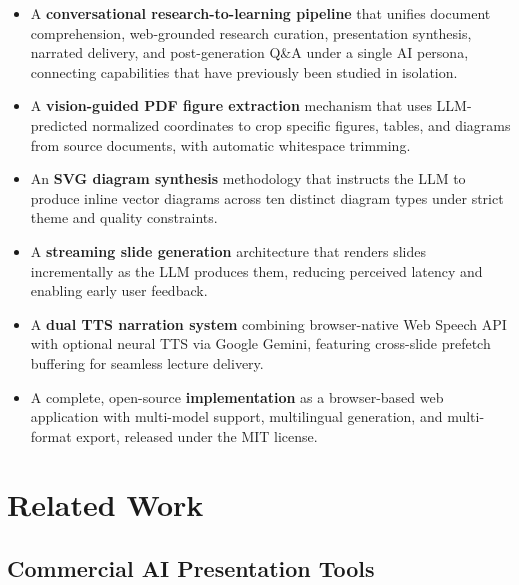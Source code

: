 \documentclass[11pt,a4paper]{article}
\begin{document}
\begin{itemize}[leftmargin=*,nosep]
    \item A \textbf{conversational research-to-learning pipeline} that unifies document comprehension, web-grounded research curation, presentation synthesis, narrated delivery, and post-generation Q\&A under a single AI persona, connecting capabilities that have previously been studied in isolation.
    \item A \textbf{vision-guided PDF figure extraction} mechanism that uses LLM-predicted normalized coordinates to crop specific figures, tables, and diagrams from source documents, with automatic whitespace trimming.
    \item An \textbf{SVG diagram synthesis} methodology that instructs the LLM to produce inline vector diagrams across ten distinct diagram types under strict theme and quality constraints.
    \item A \textbf{streaming slide generation} architecture that renders slides incrementally as the LLM produces them, reducing perceived latency and enabling early user feedback.
    \item A \textbf{dual TTS narration system} combining browser-native Web Speech API with optional neural TTS via Google Gemini, featuring cross-slide prefetch buffering for seamless lecture delivery.
    \item A complete, open-source \textbf{implementation} as a browser-based web application with multi-model support, multilingual generation, and multi-format export, released under the MIT license.
\end{itemize}


\section{Related Work}
\label{sec:related}

\subsection{Commercial AI Presentation Tools}
\end{document}

